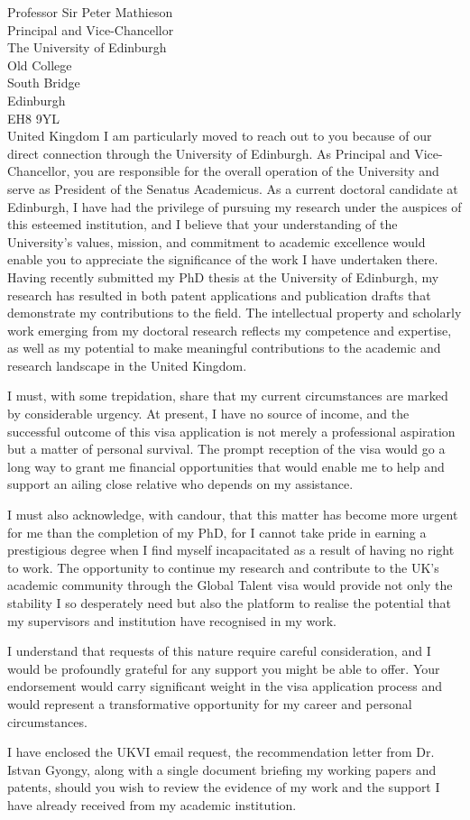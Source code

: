 \documentclass[12pt,a4paper]{letter}
\begin{document}
\begin{letter}{Professor Sir Peter Mathieson\\Principal and Vice-Chancellor\\The University of Edinburgh\\Old College\\South Bridge\\Edinburgh\\EH8 9YL\\United Kingdom}
I am particularly moved to reach out to you because of our direct connection through the University of Edinburgh. As Principal and Vice-Chancellor, you are responsible for the overall operation of the University and serve as President of the Senatus Academicus. As a current doctoral candidate at Edinburgh, I have had the privilege of pursuing my research under the auspices of this esteemed institution, and I believe that your understanding of the University's values, mission, and commitment to academic excellence would enable you to appreciate the significance of the work I have undertaken there. Having recently submitted my PhD thesis at the University of Edinburgh, my research has resulted in both patent applications and publication drafts that demonstrate my contributions to the field. The intellectual property and scholarly work emerging from my doctoral research reflects my competence and expertise, as well as my potential to make meaningful contributions to the academic and research landscape in the United Kingdom.

I must, with some trepidation, share that my current circumstances are marked by considerable urgency. At present, I have no source of income, and the successful outcome of this visa application is not merely a professional aspiration but a matter of personal survival. The prompt reception of the visa would go a long way to grant me financial opportunities that would enable me to help and support an ailing close relative who depends on my assistance. 

I must also acknowledge, with candour, that this matter has become more urgent for me than the completion of my PhD, for I cannot take pride in earning a prestigious degree when I find myself incapacitated as a result of having no right to work. The opportunity to continue my research and contribute to the UK's academic community through the Global Talent visa would provide not only the stability I so desperately need but also the platform to realise the potential that my supervisors and institution have recognised in my work.

I understand that requests of this nature require careful consideration, and I would be profoundly grateful for any support you might be able to offer. Your endorsement would carry significant weight in the visa application process and would represent a transformative opportunity for my career and personal circumstances.

I have enclosed the UKVI email request, the recommendation letter from Dr. Istvan Gyongy, along with a single document briefing my working papers and patents, should you wish to review the evidence of my work and the support I have already received from my academic institution.


\end{letter}
\end{document}
